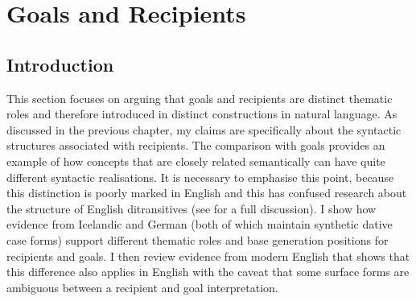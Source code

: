 \section{Goals and Recipients}
	\subsection{Introduction}
	This section focuses on arguing that goals and recipients are distinct thematic roles and therefore introduced in distinct constructions in natural language. As discussed in the previous chapter, my claims are specifically about the syntactic structures associated with recipients. The comparison with goals provides an example of how concepts that are closely related semantically can have quite different syntactic realisations. It is necessary to emphasise this point, because this distinction is poorly marked in English and this has confused research about the structure of English ditransitives (see \citet{Hovav.2008} for a full discussion). I show how evidence from Icelandic and German (both of which maintain synthetic dative case forms) support different thematic roles and base generation positions for recipients and goals. I then review evidence from modern English that shows that this difference also applies in English with the caveat that some surface forms are ambiguous between a recipient and goal interpretation. 

